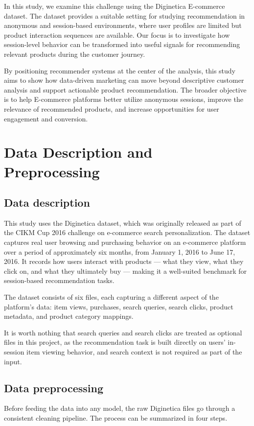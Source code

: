 \documentclass[conference]{IEEEtran}
\begin{document}
In this study, we examine this challenge using the Diginetica E-commerce dataset. The dataset provides a suitable setting for studying recommendation in anonymous and session-based environments, where user profiles are limited but product interaction sequences are available. Our focus is to investigate how session-level behavior can be transformed into useful signals for recommending relevant products during the customer journey.

By positioning recommender systems at the center of the analysis, this study aims to show how data-driven marketing can move beyond descriptive customer analysis and support actionable product recommendation. The broader objective is to help E-commerce platforms better utilize anonymous sessions, improve the relevance of recommended products, and increase opportunities for user engagement and conversion.

\section{Data Description and Preprocessing}
\subsection{Data description}
This study uses the Diginetica dataset, which was originally released as part of the CIKM Cup 2016 challenge on e-commerce search personalization. The dataset captures real user browsing and purchasing behavior on an e-commerce platform over a period of approximately six months, from January 1, 2016 to June 17, 2016. It records how users interact with products — what they view, what they click on, and what they ultimately buy — making it a well-suited benchmark for session-based recommendation tasks.

The dataset consists of six files, each capturing a different aspect of the platform's data: item views, purchases, search queries, search clicks, product metadata, and product category mappings.

It is worth nothing that search queries and search clicks are treated as optional files in this project, as the recommendation task is built directly on users' in-session item viewing behavior, and search context is not required as part of the input.

\subsection{Data preprocessing}
Before feeding the data into any model, the raw Diginetica files go through a consistent cleaning pipeline. The process can be summarized in four steps.
\end{document}
